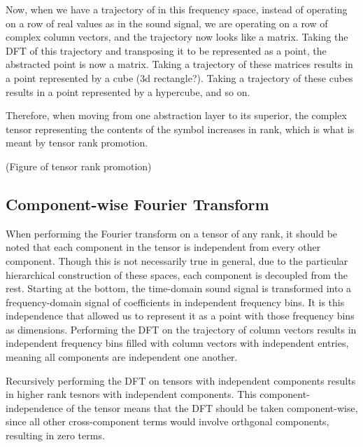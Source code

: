 Now, when we have a trajectory of in this frequency space, instead of operating on a row of real values as in the sound signal, we are operating on a row of complex column vectors, and the trajectory now looks like a matrix.  Taking the DFT of this trajectory and transposing it to be represented as a point, the abstracted point is now a matrix.  Taking a trajectory of these matrices results in a point represented by a cube (3d rectangle?).  Taking a trajectory of these cubes results in a point represented by a hypercube, and so on.

Therefore, when moving from one abstraction layer to its superior, the complex tensor representing the contents of the symbol increases in rank, which is what is meant by tensor rank promotion.

(Figure of tensor rank promotion)

\subsection{Component-wise Fourier Transform}
When performing the Fourier transform on a tensor of any rank, it should be noted that each component in the tensor is independent from every other component.  Though this is not necessarily true in general, due to the particular hierarchical construction of these spaces, each component is decoupled from the rest.  Starting at the bottom, the time-domain sound signal is transformed into a frequency-domain signal of coefficients in independent frequency bins.  It is this independence that allowed us to represent it as a point with those frequency bins as dimensions.  Performing the DFT on the trajectory of column vectors results in independent frequency bins filled with column vectors with independent entries, meaning all components are independent one another.

Recursively performing the DFT on tensors with independent components results in higher rank tesnors with independent components.  This component-independence of the tensor means that the DFT should be taken component-wise, since all other cross-component terms would involve orthgonal components, resulting in zero terms.
